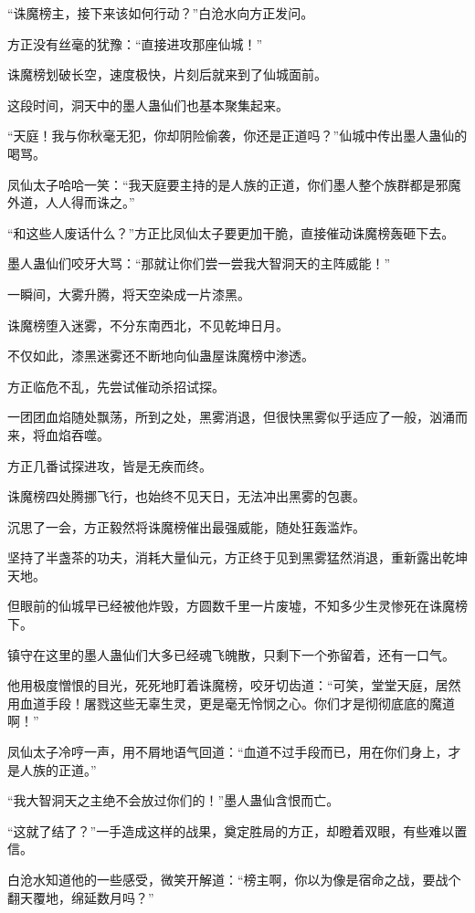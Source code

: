 \begin{this_body}
“诛魔榜主，接下来该如何行动？”白沧水向方正发问。

方正没有丝毫的犹豫：“直接进攻那座仙城！”

诛魔榜划破长空，速度极快，片刻后就来到了仙城面前。

这段时间，洞天中的墨人蛊仙们也基本聚集起来。

“天庭！我与你秋毫无犯，你却阴险偷袭，你还是正道吗？”仙城中传出墨人蛊仙的喝骂。

凤仙太子哈哈一笑：“我天庭要主持的是人族的正道，你们墨人整个族群都是邪魔外道，人人得而诛之。”

“和这些人废话什么？”方正比凤仙太子要更加干脆，直接催动诛魔榜轰砸下去。

墨人蛊仙们咬牙大骂：“那就让你们尝一尝我大智洞天的主阵威能！”

一瞬间，大雾升腾，将天空染成一片漆黑。

诛魔榜堕入迷雾，不分东南西北，不见乾坤日月。

不仅如此，漆黑迷雾还不断地向仙蛊屋诛魔榜中渗透。

方正临危不乱，先尝试催动杀招试探。

一团团血焰随处飘荡，所到之处，黑雾消退，但很快黑雾似乎适应了一般，汹涌而来，将血焰吞噬。

方正几番试探进攻，皆是无疾而终。

诛魔榜四处腾挪飞行，也始终不见天日，无法冲出黑雾的包裹。

沉思了一会，方正毅然将诛魔榜催出最强威能，随处狂轰滥炸。

坚持了半盏茶的功夫，消耗大量仙元，方正终于见到黑雾猛然消退，重新露出乾坤天地。

但眼前的仙城早已经被他炸毁，方圆数千里一片废墟，不知多少生灵惨死在诛魔榜下。

镇守在这里的墨人蛊仙们大多已经魂飞魄散，只剩下一个弥留着，还有一口气。

他用极度憎恨的目光，死死地盯着诛魔榜，咬牙切齿道：“可笑，堂堂天庭，居然用血道手段！屠戮这些无辜生灵，更是毫无怜悯之心。你们才是彻彻底底的魔道啊！”

凤仙太子冷哼一声，用不屑地语气回道：“血道不过手段而已，用在你们身上，才是人族的正道。”

“我大智洞天之主绝不会放过你们的！”墨人蛊仙含恨而亡。

“这就了结了？”一手造成这样的战果，奠定胜局的方正，却瞪着双眼，有些难以置信。

白沧水知道他的一些感受，微笑开解道：“榜主啊，你以为像是宿命之战，要战个翻天覆地，绵延数月吗？”


\end{this_body}
